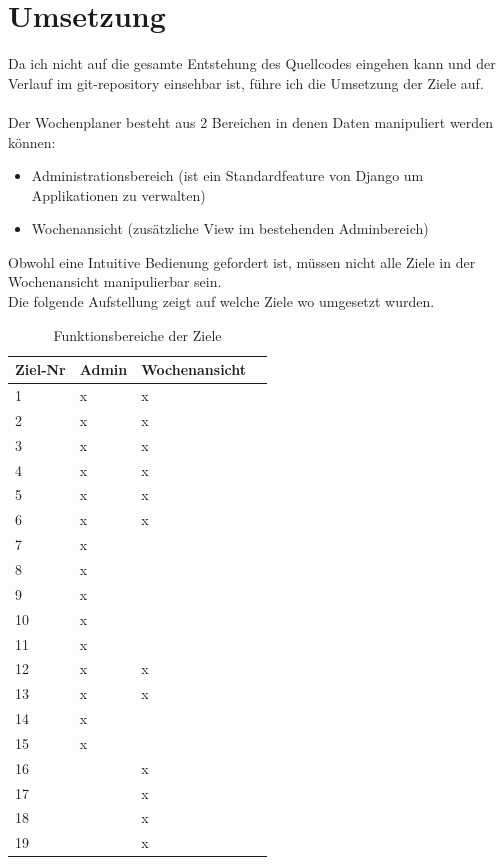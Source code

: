 \section{Umsetzung}
Da ich nicht auf die gesamte Entstehung des Quellcodes eingehen kann und der Verlauf im git-repository einsehbar ist,
führe ich die Umsetzung der Ziele auf.\\\\
Der Wochenplaner besteht aus 2 Bereichen in denen Daten manipuliert werden können:
\begin{itemize}
    \item Administrationsbereich (ist ein Standardfeature von Django um Applikationen zu verwalten)
    \item Wochenansicht (zusätzliche View im bestehenden Adminbereich)\\
\end{itemize}
Obwohl eine Intuitive Bedienung gefordert ist, müssen nicht alle Ziele in der Wochenansicht manipulierbar sein.\\
Die folgende Aufstellung zeigt auf welche Ziele wo umgesetzt wurden.\\

\begin{table}[!ht]
\begin{center}
    \begin{longtable}{llp{3cm}l}
        \toprule Ziel-Nr & Admin & Wochenansicht \\
        \midrule 1 & x & x \\
        \midrule 2 & x & x \\
        \midrule 3 & x & x \\
        \midrule 4 & x & x \\
        \midrule 5 & x & x \\
        \midrule 6 & x & x \\ 
        \midrule 7 & x &  \\
        \midrule 8 & x &  \\
        \midrule 9 & x &  \\
        \midrule 10 & x &  \\
        \midrule 11 & x &  \\
        \midrule 12 & x & x \\
        \midrule 13 & x & x \\
        \midrule 14 & x &  \\
        \midrule 15 & x &  \\
        \midrule 16 &  & x \\
        \midrule 17 &  & x \\
        \midrule 18 &  & x \\
        \midrule 19 &  & x \\
        \bottomrule
        \end{longtable}
    \caption{Funktionsbereiche der Ziele}
    \label{tab:funktionsbereiche_ziele}
\end{center}
\end{table}
